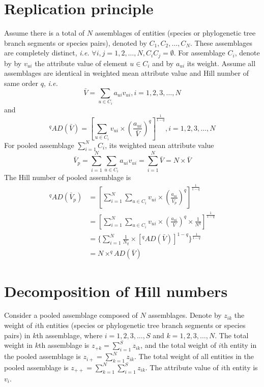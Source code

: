 \documentclass[11pt]{article}
\begin{document}
\section{Replication principle}
Assume there is a total of $N$ assemblages of entities (species or phylogenetic tree branch segments or species pairs), denoted by $C_1, C_2,\dots,C_N$. 
These assemblages are completely distinct, \textit{i.e.} $\forall i,j=1,2,\dots,N, C_iC_j = \emptyset$. 
For assemblage $C_i$, denote by by $v_{ui}$ the attribute value of element $u \in C_i$ and by $a_{ui}$ its weight. 
Assume all assemblages are identical in weighted mean attribute value and Hill number of same order $q$, \textit{i.e.}
\begin{equation}
    \bar{V} = \sum\limits_{u\in C_i}a_{ui}v_{ui}, i = 1,2,3,\dots,N
\end{equation}
and 
\begin{equation}
    ^{q}AD(\bar{V}) = [\sum\limits_{u\in C_i} v_{ui} \times (\frac{a_{ui}}{\bar{V}})^q]^{\frac{1}{1-q}}, i = 1,2,3,\dots,N
\end{equation}
For pooled assemblage $\sum\limits_{i=1}^{N}C_i$, its weighted mean attribute value 
\begin{equation}
    \bar{V}_p = \sum\limits_{i=1}^{N} \sum\limits_{u\in C_i}a_{ui}v_{ui} = \sum\limits_{i=1}^{N} \bar{V} = N \times \bar{V}
\end{equation}
The Hill number of pooled assemblage is 
\begin{equation}
    \begin{aligned}
    ^{q}AD(\bar{V}_p) & = 
    [\sum\limits_{i=1}^{N} \sum\limits_{u\in C_i} v_{ui} \times (\frac{a_{ui}}{\bar{V}_p})^q]^{\frac{1}{1-q}} \\ & =
    [\sum\limits_{i=1}^{N} \sum\limits_{u\in C_i} v_{ui} \times (\frac{a_{ui}}{\bar{V}})^q \times \frac{1}{N^q}]^{\frac{1}{1-q}} \\ & = 
    \{\sum\limits_{i=1}^{N} \frac{1}{N_q} \times [^{q}AD(\bar{V})]^{1-q}\}^{\frac{1}{1-q}} \\ &=
    N \times ^{q}AD(\bar{V})
    \end{aligned}
    \label{ReplicationPrinciple}
\end{equation}

\section{Decomposition of Hill numbers}
Consider a pooled assemblage composed of $N$ assemblages. 
Denote by $z_{ik}$ the weight of $i$th entities (species or phylogenetic tree branch segments or species pairs) in $k$th assemblage, where $i=1,2,3,\dots,S$ and $k=1,2,3,\dots,N$. 
The total weight in $k$th assemblage is $z_{+k}=\sum_{i=1}^{S}z_{ik}$, and the total weight of $i$th entity in the pooled assemblage is $z_{i+}=\sum_{k=1}^{N}z_{ik}$. 
The total weight of all entities in the pooled assemblage is $z_{++}=\sum_{k=1}^{N}\sum_{i=1}^{S}z_{ik}$. 
The attribute value of $i$th entity is $v_i$. 
\end{document}
